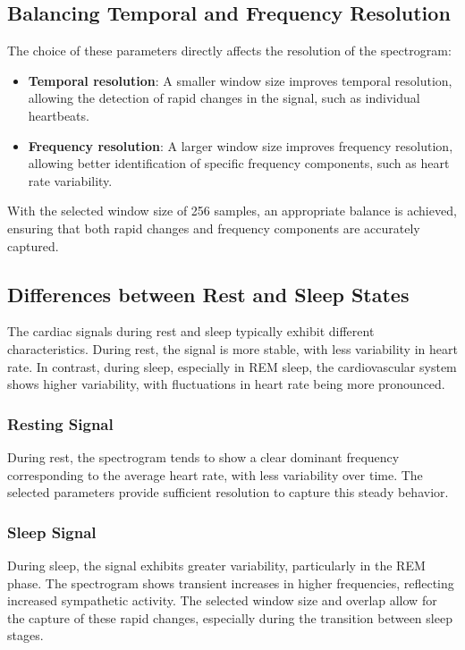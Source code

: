 \documentclass[10pt]{article}
\theoremstyle{definition}
\theoremstyle{remark}
\theoremstyle{definition}
\numberwithin{equation}{prob}
\begin{document}
\subsection{Balancing Temporal and Frequency Resolution}

The choice of these parameters directly affects the resolution of the spectrogram:
\begin{itemize}
    \item \textbf{Temporal resolution}: A smaller window size improves temporal resolution, allowing the detection of rapid changes in the signal, such as individual heartbeats.
    \item \textbf{Frequency resolution}: A larger window size improves frequency resolution, allowing better identification of specific frequency components, such as heart rate variability.
\end{itemize}

With the selected window size of 256 samples, an appropriate balance is achieved, ensuring that both rapid changes and frequency components are accurately captured.

\subsection{Differences between Rest and Sleep States}

The cardiac signals during rest and sleep typically exhibit different characteristics. During rest, the signal is more stable, with less variability in heart rate. In contrast, during sleep, especially in REM sleep, the cardiovascular system shows higher variability, with fluctuations in heart rate being more pronounced.

\subsubsection{Resting Signal}

During rest, the spectrogram tends to show a clear dominant frequency corresponding to the average heart rate, with less variability over time. The selected parameters provide sufficient resolution to capture this steady behavior.

\subsubsection{Sleep Signal}

During sleep, the signal exhibits greater variability, particularly in the REM phase. The spectrogram shows transient increases in higher frequencies, reflecting increased sympathetic activity. The selected window size and overlap allow for the capture of these rapid changes, especially during the transition between sleep stages.
\end{document}
